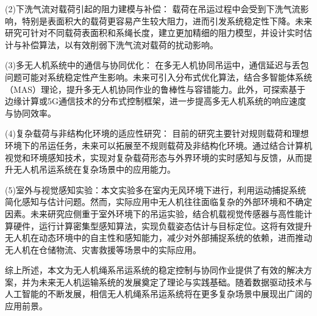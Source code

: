 \documentclass[lang=chs, degree=master, blindreview=false, winfonts=true]{yanputhesis}
\begin{document}
(2)下洗气流对载荷引起的阻力建模与补偿：
载荷在吊运过程中会受到下洗气流影响，特别是表面积大的载荷更容易产生较大阻力，进而引发系统稳定性下降。未来研究可针对不同载荷表面积和系绳长度，建立更加精细的阻力模型，并设计实时估计与补偿算法，以有效削弱下洗气流对载荷的扰动影响。

(3)多无人机系统中的通信与协同优化：
在多无人机协同吊运中，通信延迟与丢包问题可能对系统稳定性产生影响。未来可引入分布式优化算法，结合多智能体系统（MAS）理论，提升多无人机协同作业的鲁棒性与容错能力。此外，可探索基于边缘计算或5G通信技术的分布式控制框架，进一步提高多无人机系统的响应速度与协同效率。

(4)复杂载荷与非结构化环境的适应性研究：
目前的研究主要针对规则载荷和理想环境下的吊运任务，未来可以拓展至不规则载荷及非结构化环境。通过结合计算机视觉和环境感知技术，实现对复杂载荷形态与外界环境的实时感知与反馈，从而提升无人机吊运系统在复杂场景中的应用能力。

(5)室外与视觉感知实验：本文实验多在室内无风环境下进行，利用运动捕捉系统简化感知与估计问题。然而，实际应用中无人机往往面临复杂的外部环境和不确定因素。未来研究应侧重于室外环境下的吊运实验，结合机载视觉传感器与高性能计算硬件，运行计算密集型感知算法，实现负载姿态估计与目标定位。这将有效提升无人机在动态环境中的自主性和感知能力，减少对外部捕捉系统的依赖，进而推动无人机在仓储物流、灾害救援等场景中的实际应用。

综上所述，本文为无人机绳系吊运系统的稳定控制与协同作业提供了有效的解决方案，并为未来无人机运输系统的发展奠定了理论与实践基础。随着数据驱动技术与人工智能的不断发展，相信无人机绳系吊运系统将在更多复杂场景中展现出广阔的应用前景。





\backmatter                                                 %
%
\end{document}
